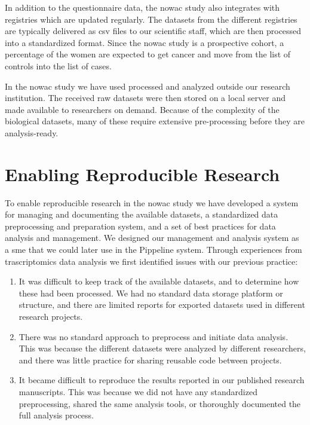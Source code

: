 In addition to the questionnaire data, the \gls{nowac} study also integrates
with registries which are updated regularly. The datasets from the different
registries are typically delivered as \gls{csv} files to our scientific staff,
which are then processed into a standardized format. Since the \gls{nowac} study
is a prospective cohort, a percentage of the women are expected to get cancer
and move from the list of controls into the list of cases. 

In the \gls{nowac} study we have used processed and analyzed outside our
research institution.  The received raw datasets were then stored on a
local server and made available to researchers on demand. Because of the
complexity of the biological datasets, many of these require extensive
pre-processing before they are analysis-ready. 


\section{Enabling Reproducible Research} 
To enable reproducible research in the \gls{nowac} study we have developed a
system for managing and documenting the available datasets, a standardized data
preprocessing and preparation system, and a set of best practices for data
analysis and management. We designed our management and analysis system as a
\gls{sme} that we could later use in the Pippeline system. Through experiences
from trascriptomics data analysis we first identified issues with our previous
practice: 

\begin{enumerate} 
    \item It was difficult to keep track of the available datasets, and to
        determine how these had been processed. We had no standard data storage
        platform or structure, and there are limited reports for exported
        datasets used in different research projects.
        
    \item There was no standard approach to preprocess and initiate data
        analysis. This was because the different datasets were analyzed by
        different researchers, and there was little practice for sharing
        reusable code between projects. 

    \item It became difficult to reproduce the results reported in our published
        research manuscripts. This was because we did not have any standardized
        preprocessing, shared the same analysis tools, or thoroughly documented
        the full analysis process. 
        
\end{enumerate} 


